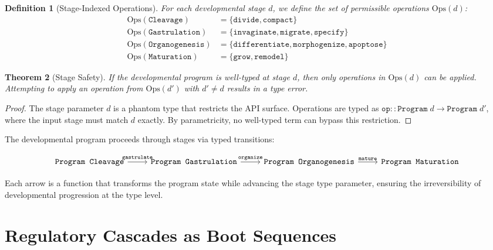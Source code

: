 \documentclass[12pt,a4paper]{article}
\newtheorem{theorem}{Theorem}[section]
\newtheorem{definition}[theorem]{Definition}
\begin{document}
\begin{definition}[Stage-Indexed Operations]\label{def:stage-ops}
For each developmental stage $d$, we define the set of permissible
operations $\text{Ops}(d)$:
\begin{align*}
  \text{Ops}(\texttt{Cleavage}) &= \{\texttt{divide}, \texttt{compact}\} \\
  \text{Ops}(\texttt{Gastrulation}) &= \{\texttt{invaginate},
    \texttt{migrate}, \texttt{specify}\} \\
  \text{Ops}(\texttt{Organogenesis}) &= \{\texttt{differentiate},
    \texttt{morphogenize}, \texttt{apoptose}\} \\
  \text{Ops}(\texttt{Maturation}) &= \{\texttt{grow},
    \texttt{remodel}\}
\end{align*}
\end{definition}

\begin{theorem}[Stage Safety]\label{thm:stage-safety}
If the developmental program is well-typed at stage $d$, then
only operations in $\text{Ops}(d)$ can be applied.  Attempting
to apply an operation from $\text{Ops}(d')$ with $d' \neq d$
results in a type error.
\end{theorem}

\begin{proof}
The stage parameter $d$ is a phantom type that restricts the
API surface.  Operations are typed as
$\texttt{op} :: \texttt{Program}\;d \to \texttt{Program}\;d'$,
where the input stage must match $d$ exactly.  By parametricity,
no well-typed term can bypass this restriction.
\end{proof}

The developmental program proceeds through stages via typed
transitions:

\[
\begin{tikzcd}
  \texttt{Program Cleavage} \arrow[r, "\texttt{gastrulate}"] &
  \texttt{Program Gastrulation} \arrow[r, "\texttt{organize}"] &
  \texttt{Program Organogenesis} \arrow[r, "\texttt{mature}"] &
  \texttt{Program Maturation}
\end{tikzcd}
\]

Each arrow is a function that transforms the program state while
advancing the stage type parameter, ensuring the irreversibility
of developmental progression at the type level.


\section{Regulatory Cascades as Boot Sequences}\label{sec:regulatory}
\end{document}
